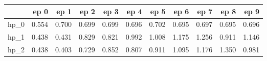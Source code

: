 \begin{tabular}{lrrrrrrrrrr}
\toprule
{} &   ep 0 &   ep 1 &   ep 2 &   ep 3 &   ep 4 &   ep 5 &   ep 6 &   ep 7 &   ep 8 &   ep 9 \\
\midrule
hp\_0 &  0.554 &  0.700 &  0.699 &  0.699 &  0.696 &  0.702 &  0.695 &  0.697 &  0.695 &  0.696 \\
hp\_1 &  0.438 &  0.431 &  0.829 &  0.821 &  0.992 &  1.008 &  1.175 &  1.256 &  0.911 &  1.146 \\
hp\_2 &  0.438 &  0.403 &  0.729 &  0.852 &  0.807 &  0.911 &  1.095 &  1.176 &  1.350 &  0.981 \\
\bottomrule
\end{tabular}
